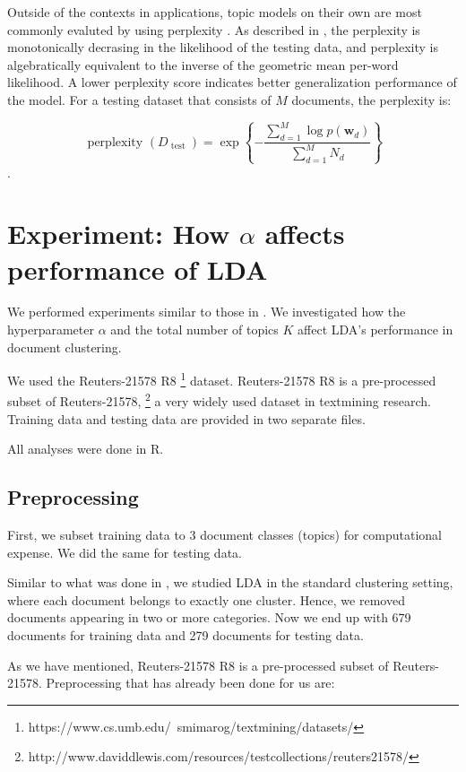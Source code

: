 \documentclass{article}
\begin{document}
Outside of the contexts in applications, topic models on their own are most commonly evaluted by using perplexity \cite{Griffiths5228}. As described in \cite{blei2003latent}, the perplexity is monotonically decrasing in the likelihood of the testing data, and perplexity is algebratically equivalent to the inverse of the geometric mean per-word likelihood. A lower perplexity score indicates better generalization performance of the model. For a testing dataset that consists of $M$ documents, the perplexity is:

$$
\text { perplexity }\left(D_{\text { test }}\right)=\exp \left\{-\frac{\sum_{d=1}^{M} \log p\left(\mathbf{w}_{d}\right)}{\sum_{d=1}^{M} N_{d}}\right\}
$$.






\section{Experiment: How $\alpha$ affects performance of LDA}

We performed experiments similar to those in \cite{lu2011investigating}. We investigated how the hyperparameter $\alpha$ and the total number of topics $K$ affect LDA's performance in document clustering.

We used the Reuters-21578 R8 \footnote{https://www.cs.umb.edu/~smimarog/textmining/datasets/} dataset. Reuters-21578 R8 is a pre-processed subset of Reuters-21578, \footnote{http://www.daviddlewis.com/resources/testcollections/reuters21578/} a very widely used dataset in textmining research. Training data and testing data are provided in two separate files.

All analyses were done in R.

\subsection{Preprocessing}

First, we subset training data to 3 document classes (topics) for computational expense. We did the same for testing data.

Similar to what was done in \cite{lu2011investigating}, we studied LDA in the standard clustering setting, where each document belongs to exactly one cluster. Hence, we removed documents appearing in two or more categories. Now we end up with 679 documents for training data and 279 documents for testing data.

As we have mentioned, Reuters-21578 R8 is a pre-processed subset of Reuters-21578. Preprocessing that has already been done for us are:
\end{document}

